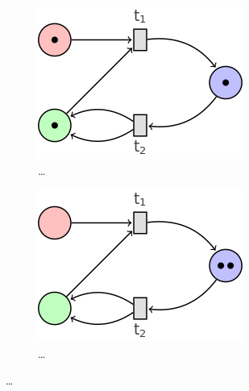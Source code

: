 \documentclass[11pt]{extarticle}
\begin{document}
\begin{figure}[!h]
 \begin{subfigure}{0.4\textwidth}
     \includegraphics[width=\textwidth]{marking_1}
     \caption{\dots}
     \label{fig:a}
 \end{subfigure}
 \hfill
 \begin{subfigure}{0.4\textwidth}
     \includegraphics[width=\textwidth]{marking_2}
     \caption{\dots}
     \label{fig:b}
 \end{subfigure}
 

\end{figure}
\end{document}
